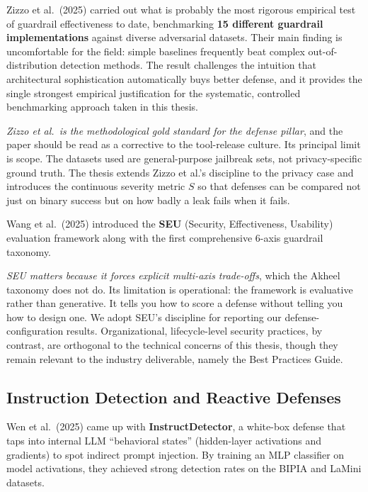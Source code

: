 \documentclass[11pt,a4paper]{report}
\begin{document}
Zizzo et al.\ (2025) carried out what is probably the most rigorous empirical test of guardrail effectiveness to date, benchmarking \textbf{15 different guardrail implementations} against diverse adversarial datasets. Their main finding is uncomfortable for the field: simple baselines frequently beat complex out-of-distribution detection methods. The result challenges the intuition that architectural sophistication automatically buys better defense, and it provides the single strongest empirical justification for the systematic, controlled benchmarking approach taken in this thesis.

\begin{critbox}
\textit{Zizzo et al.\ is the methodological gold standard for the defense pillar}, and the paper should be read as a corrective to the tool-release culture. Its principal limit is scope. The datasets used are general-purpose jailbreak sets, not privacy-specific ground truth. The thesis extends Zizzo et al.'s discipline to the privacy case and introduces the continuous severity metric $S$ so that defenses can be compared not just on binary success but on how badly a leak fails when it fails.
\end{critbox}

Wang et al.\ (2025) introduced the \textbf{SEU} (Security, Effectiveness, Usability) evaluation framework along with the first comprehensive 6-axis guardrail taxonomy.

\begin{critbox}
\textit{SEU matters because it forces explicit multi-axis trade-offs}, which the Akheel taxonomy does not do. Its limitation is operational: the framework is evaluative rather than generative. It tells you how to score a defense without telling you how to design one. We adopt SEU's discipline for reporting our defense-configuration results. Organizational, lifecycle-level security practices, by contrast, are orthogonal to the technical concerns of this thesis, though they remain relevant to the industry deliverable, namely the Best Practices Guide.
\end{critbox}

\subsection{Instruction Detection and Reactive Defenses}

Wen et al.\ (2025) came up with \textbf{InstructDetector}, a white-box defense that taps into internal LLM ``behavioral states'' (hidden-layer activations and gradients) to spot indirect prompt injection. By training an MLP classifier on model activations, they achieved strong detection rates on the BIPIA and LaMini datasets.
\end{document}
